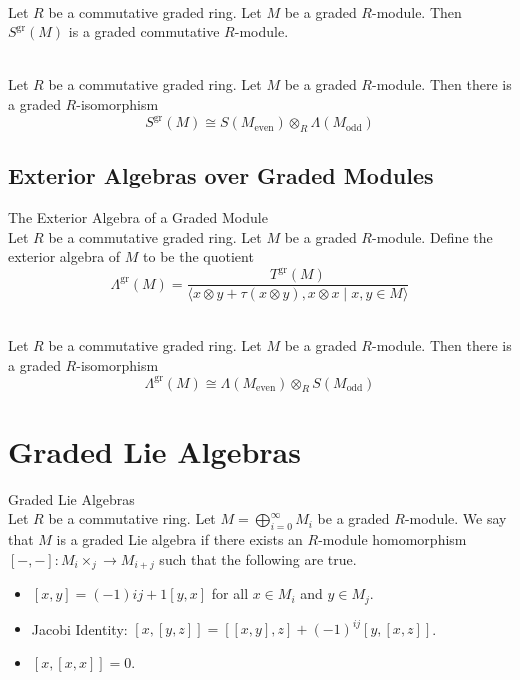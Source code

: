 \documentclass[a4paper]{article}
\begin{document}
\begin{prp}{}{}\\
Let $R$ be a commutative graded ring. Let $M$ be a graded $R$-module. Then $S^\text{gr}(M)$ is a graded commutative $R$-module. 
\end{prp}

\begin{prp}{}{}\\
Let $R$ be a commutative graded ring. Let $M$ be a graded $R$-module. Then there is a graded $R$-isomorphism $$S^\text{gr}(M)\cong S(M_\text{even})\otimes_R\Lambda(M_\text{odd})$$
\end{prp}

\subsection{Exterior Algebras over Graded Modules}
\begin{defn}{The Exterior Algebra of a Graded Module}{}\\
Let $R$ be a commutative graded ring. Let $M$ be a graded $R$-module. Define the exterior algebra of $M$ to be the quotient $$\Lambda^\text{gr}(M)=\frac{T^\text{gr}(M)}{\langle x\otimes y+\tau(x\otimes y),x\otimes x\;|\;x,y\in M\rangle}$$
\end{defn}

\begin{prp}{}{}\\
Let $R$ be a commutative graded ring. Let $M$ be a graded $R$-module. Then there is a graded $R$-isomorphism $$\Lambda^\text{gr}(M)\cong\Lambda(M_\text{even})\otimes_RS(M_\text{odd})$$
\end{prp}

\pagebreak
\section{Graded Lie Algebras}
\begin{defn}{Graded Lie Algebras}{}\\
Let $R$ be a commutative ring. Let $M=\bigoplus_{i=0}^\infty M_i$ be a graded $R$-module. We say that $M$ is a graded Lie algebra if there exists an $R$-module homomorphism $[-,-]:M_i\times_j\to M_{i+j}$ such that the following are true. 
\begin{itemize}
\item $[x,y]=(-1){ij+1}[y,x]$ for all $x\in M_i$ and $y\in M_j$. 
\item Jacobi Identity: $[x,[y,z]]=[[x,y],z]+(-1)^{ij}[y,[x,z]]$. 
\item $[x,[x,x]]=0$. 
\end{itemize}
\end{defn}
\end{document}
